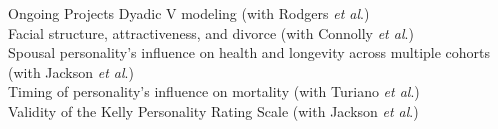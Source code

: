 \documentclass {resume}
\newcommand{\meb}{{\bf Garrison, S. M.}\xspace}
\newcommand{\et}{\textit{et al}.\xspace}
\begin{document}
\pagebreak
\begin{rSection}{\textrm{Ongoing Projects}}
Dyadic \textrm{V} modeling (with Rodgers \et)\smallskip\\
Facial structure, attractiveness, and divorce (with Connolly \et)\smallskip\\
Spousal personality's influence on health and longevity across multiple cohorts (with Jackson \et)\smallskip\\
Timing of personality's influence on mortality (with Turiano \et)\smallskip\\
Validity of the Kelly Personality Rating Scale (with Jackson \et)
\end{rSection}

\end{document}
